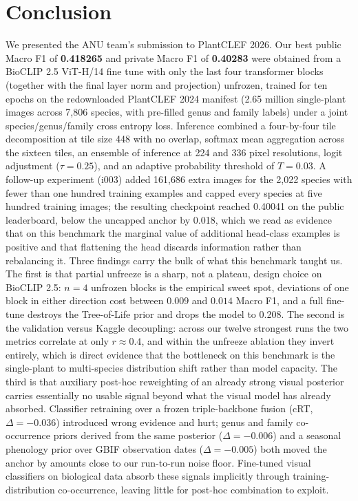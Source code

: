 \documentclass[sigconf]{ceurart}
\begin{document}
\section{Conclusion}
\label{sec:conclusion}
We presented the ANU team's submission to PlantCLEF 2026. Our best public Macro F1 of \textbf{0.418265} and private Macro F1 of \textbf{0.40283} were obtained from a BioCLIP 2.5 ViT-H/14 fine tune with only the last four transformer blocks (together with the final layer norm and projection) unfrozen, trained for ten epochs on the redownloaded PlantCLEF 2024 manifest (2.65 million single-plant images across 7,806 species, with pre-filled genus and family labels) under a joint species/genus/family cross entropy loss. Inference combined a four-by-four tile decomposition at tile size 448 with no overlap, softmax mean aggregation across the sixteen tiles, an ensemble of inference at 224 and 336 pixel resolutions, logit adjustment ($\tau{=}0.25$), and an adaptive probability threshold of $T{=}0.03$. A follow-up experiment (i003) added 161,686 extra images for the 2,022 species with fewer than one hundred training examples and capped every species at five hundred training images; the resulting checkpoint reached 0.40041 on the public leaderboard, below the uncapped anchor by 0.018, which we read as evidence that on this benchmark the marginal value of additional head-class examples is positive and that flattening the head discards information rather than rebalancing it.
Three findings carry the bulk of what this benchmark taught us. The first is that partial unfreeze is a sharp, not a plateau, design choice on BioCLIP 2.5: $n{=}4$ unfrozen blocks is the empirical sweet spot, deviations of one block in either direction cost between $0.009$ and $0.014$ Macro F1, and a full fine-tune destroys the Tree-of-Life prior and drops the model to 0.208. The second is the validation versus Kaggle decoupling: across our twelve strongest runs the two metrics correlate at only $r \approx 0.4$, and within the unfreeze ablation they invert entirely, which is direct evidence that the bottleneck on this benchmark is the single-plant to multi-species distribution shift rather than model capacity. The third is that auxiliary post-hoc reweighting of an already strong visual posterior carries essentially no usable signal beyond what the visual model has already absorbed. Classifier retraining over a frozen triple-backbone fusion (cRT, $\Delta {=} -0.036$) introduced wrong evidence and hurt; genus and family co-occurrence priors derived from the same posterior ($\Delta {=} -0.006$) and a seasonal phenology prior over GBIF observation dates ($\Delta {=} -0.005$) both moved the anchor by amounts close to our run-to-run noise floor. Fine-tuned visual classifiers on biological data absorb these signals implicitly through training-distribution co-occurrence, leaving little for post-hoc combination to exploit.
\end{document}
